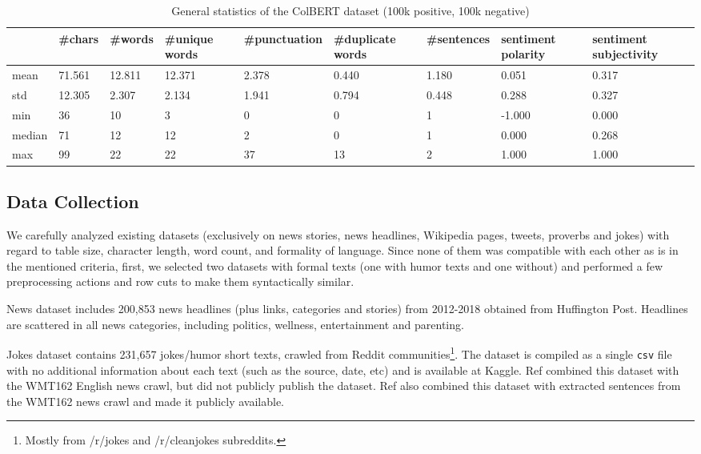 \documentclass[journal]{IEEEtran}
\begin{document}
\begin{table*}[t]
  \caption{General statistics of the ColBERT dataset (100k positive, 100k negative)}
  \label{table-2}
  \centering
  \begin{tabular}{p{0.9cm}|p{0.7cm}p{0.8cm}p{0.8cm}p{1.6cm}p{1.2cm}p{1.2cm}p{1.2cm}p{1.7cm}}
\hline & \#chars & \#words & \#unique words & \#punctuation & \#duplicate words & \#sentences & sentiment polarity & sentiment subjectivity \\ \hline
mean & 71.561  & 12.811  & 12.371         & 2.378          & 0.440             & 1.180       & 0.051              & 0.317                  \\
std  & 12.305  & 2.307   & 2.134          & 1.941          & 0.794             & 0.448       & 0.288              & 0.327                  \\
min  & 36      & 10      & 3              & 0              & 0                 & 1           & -1.000             & 0.000                  \\
median & 71      & 12      & 12             & 2              & 0                 & 1           & 0.000              & 0.268                  \\
max  & 99      & 22      & 22             & 37             & 13                & 2           & 1.000              & 1.000     \\ \hline
  \end{tabular}
\end{table*}

\subsection{Data Collection}

We carefully analyzed existing datasets (exclusively on news stories, news headlines, Wikipedia pages, tweets, proverbs and jokes) with regard to table size, character length, word count, and formality of language. Since none of them was compatible with each other as is in the mentioned criteria, first, we selected two datasets with formal texts (one with humor texts and one without) and performed a few preprocessing actions and row cuts to make them syntactically similar.

News dataset includes 200,853 news headlines (plus links, categories and stories) from 2012-2018 obtained from Huffington Post. Headlines are scattered in all news categories, including politics, wellness, entertainment and parenting.

Jokes dataset contains 231,657 jokes/humor short texts, crawled from Reddit communities\footnote{Mostly from /r/jokes and /r/cleanjokes subreddits.}. The dataset is compiled as a single \verb+csv+ file with no additional information about each text (such as the source, date, etc) and is available at Kaggle. Ref \cite{chen2018humor} combined this dataset with the WMT162 English news crawl, but did not publicly publish the dataset. Ref \cite{weller2019humor} also combined this dataset with extracted sentences from the WMT162 news crawl and made it publicly available.
\end{document}
